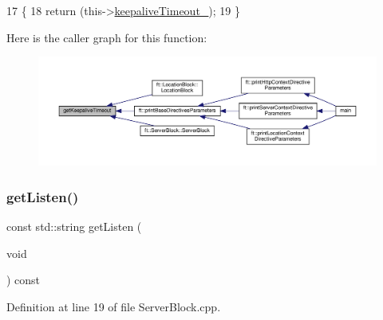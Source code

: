 \begin{DoxyCode}
17     \{
18         \textcolor{keywordflow}{return} (this->\hyperlink{classft_1_1_base_directives_aa1f5f394b428d0d18765a9b9e14e648f}{keepaliveTimeout\_});
19     \}
\end{DoxyCode}
Here is the caller graph for this function\+:
\nopagebreak
\begin{figure}[H]
\begin{center}
\leavevmode
\includegraphics[width=350pt]{classft_1_1_base_directives_ab8574338758f65325cab5d1c394826c8_icgraph}
\end{center}
\end{figure}
\mbox{\label{classft_1_1_server_block_afc115b2997340935536bf8135e02b68c}} 
\subsubsection{\texorpdfstring{get\+Listen()}{getListen()}}
{\footnotesize\ttfamily const std\+::string get\+Listen (\begin{DoxyParamCaption}\item[{void}]{ }\end{DoxyParamCaption}) const}



Definition at line 19 of file Server\+Block.\+cpp.


